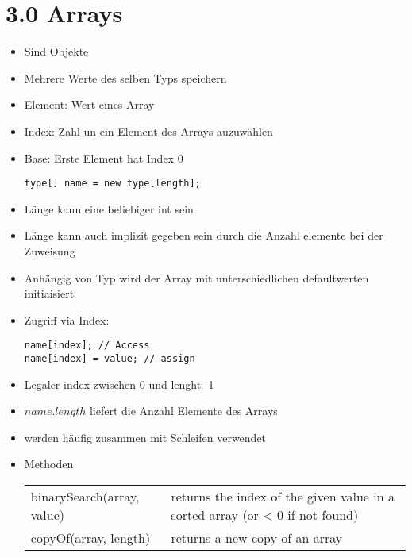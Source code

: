 \documentclass[11pt]{article}
\begin{document}
\section{3.0 Arrays}
\label{sec:org232b73c}
\begin{itemize}
\item Sind Objekte\\
\item Mehrere Werte des selben Typs speichern\\
\item Element: Wert eines Array\\
\item Index: Zahl un ein Element des Arrays auzuwählen\\
\item Base: Erste Element hat Index 0\\
\begin{verbatim}
type[] name = new type[length];
\end{verbatim}
\item Länge kann eine beliebiger int sein\\
\item Länge kann auch implizit gegeben sein durch die Anzahl elemente bei der Zuweisung\\
\item Anhängig von Typ wird der Array mit unterschiedlichen defaultwerten initiaisiert\\
\item Zugriff via Index:\\
\begin{verbatim}
name[index]; // Access
name[index] = value; // assign
\end{verbatim}
\item Legaler index zwischen 0 und lenght -1\\
\item \(name.length\) liefert die Anzahl Elemente des Arrays\\
\item werden häufig zusammen mit Schleifen verwendet\\
\item Methoden\\
\begin{center}
\begin{tabular}{ll}
binarySearch(array, value) & returns the index of the given value in a sorted array (or < 0 if not found)\\
copyOf(array, length) & returns a new copy of an array\\

\end{tabular}
\end{center}
\end{itemize}
\end{document}
